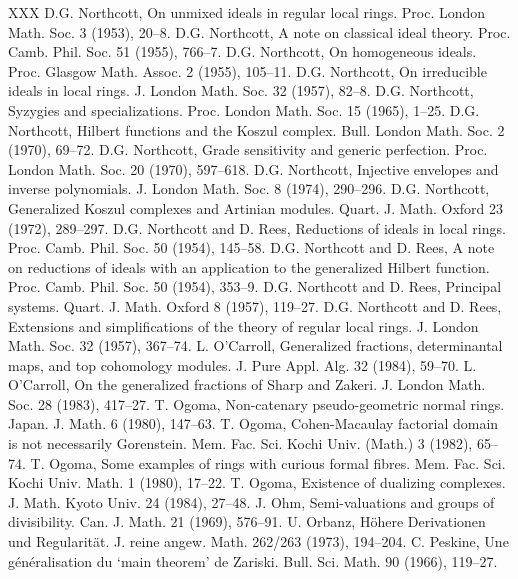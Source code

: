 \begin{thebibliography}{XXX}
 D.G. Northcott, On unmixed ideals in regular local rings. Proc. London Math. Soc. 3 (1953), 20--8.
 D.G. Northcott, A note on classical ideal theory. Proc. Camb. Phil. Soc. 51 (1955), 766--7.
 D.G. Northcott, On homogeneous ideals. Proc. Glasgow Math. Assoc. 2 (1955), 105--11.
 D.G. Northcott, On irreducible ideals in local rings. J. London Math. Soc. 32 (1957), 82--8.
 D.G. Northcott, Syzygies and specializations. Proc. London Math. Soc. 15 (1965), 1--25.
 D.G. Northcott, Hilbert functions and the Koszul complex. Bull. London Math. Soc. 2 (1970), 69--72.
 D.G. Northcott, Grade sensitivity and generic perfection. Proc. London Math. Soc. 20 (1970), 597--618.
 D.G. Northcott, Injective envelopes and inverse polynomials. J. London Math. Soc. 8 (1974), 290--296.
 D.G. Northcott, Generalized Koszul complexes and Artinian modules. Quart. J. Math. Oxford 23 (1972), 289--297.
 D.G. Northcott and D. Rees, Reductions of ideals in local rings. Proc. Camb. Phil. Soc. 50 (1954), 145--58.
 D.G. Northcott and D. Rees, A note on reductions of ideals with an application to the generalized Hilbert function. Proc. Camb. Phil. Soc. 50 (1954), 353--9.
 D.G. Northcott and D. Rees, Principal systems. Quart. J. Math. Oxford 8 (1957), 119--27.
 D.G. Northcott and D. Rees, Extensions and simplifications of the theory of regular local rings. J. London Math. Soc. 32 (1957), 367--74.
 L. O'Carroll, Generalized fractions, determinantal maps, and top cohomology modules. J. Pure Appl. Alg. 32 (1984), 59--70.
 L. O'Carroll, On the generalized fractions of Sharp and Zakeri. J. London Math. Soc. 28 (1983), 417--27.
 T. Ogoma, Non-catenary pseudo-geometric normal rings. Japan. J. Math. 6 (1980), 147--63.
 T. Ogoma, Cohen-Macaulay factorial domain is not necessarily Gorenstein. Mem. Fac. Sci. Kochi Univ. (Math.) 3 (1982), 65--74.
 T. Ogoma, Some examples of rings with curious formal fibres. Mem. Fac. Sci. Kochi Univ. Math. 1 (1980), 17--22.
 T. Ogoma, Existence of dualizing complexes. J. Math. Kyoto Univ. 24 (1984), 27--48.
 J. Ohm, Semi-valuations and groups of divisibility. Can. J. Math. 21 (1969), 576--91.
 U. Orbanz, H\"ohere Derivationen und Regularit\"at. J. reine angew. Math. 262/263 (1973), 194--204.
 C. Peskine, Une g\'en\'eralisation du `main theorem' de Zariski. Bull. Sci. Math. 90 (1966), 119--27.

\end{thebibliography}
